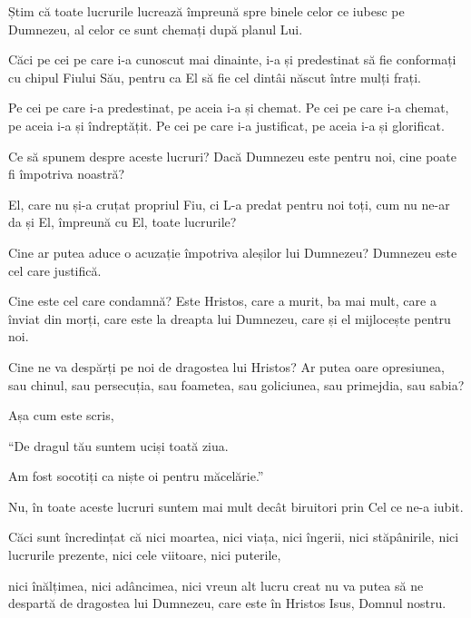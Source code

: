 {\par }{\PP {}Știm că toate lucrurile lucrează împreună spre binele celor ce iubesc pe Dumnezeu, al celor ce sunt chemați după planul Lui.

Căci pe cei pe care i-a cunoscut mai dinainte, i-a și predestinat să fie conformați cu chipul Fiului Său, pentru ca El să fie cel dintâi născut între mulți frați.

Pe cei pe care i-a predestinat, pe aceia i-a și chemat. Pe cei pe care i-a chemat, pe aceia i-a și îndreptățit. Pe cei pe care i-a justificat, pe aceia i-a și glorificat.


\par }{\PP {}Ce să spunem despre aceste lucruri? Dacă Dumnezeu este pentru noi, cine poate fi împotriva noastră?

El, care nu și-a cruțat propriul Fiu, ci L-a predat pentru noi toți, cum nu ne-ar da și El, împreună cu El, toate lucrurile?

Cine ar putea aduce o acuzație împotriva aleșilor lui Dumnezeu? Dumnezeu este cel care justifică.

Cine este cel care condamnă? Este Hristos, care a murit, ba mai mult, care a înviat din morți, care este la dreapta lui Dumnezeu, care și el mijlocește pentru noi.


\par }{\PP {}Cine ne va despărți pe noi de dragostea lui Hristos? Ar putea oare opresiunea, sau chinul, sau persecuția, sau foametea, sau goliciunea, sau primejdia, sau sabia?

Așa cum este scris,

\par }{\Q “De dragul tău suntem uciși toată ziua.

\par }{\QB Am fost socotiți ca niște oi pentru măcelărie.”


\par }{\MM {}Nu, în toate aceste lucruri suntem mai mult decât biruitori prin Cel ce ne-a iubit.

Căci sunt încredințat că nici moartea, nici viața, nici îngerii, nici stăpânirile, nici lucrurile prezente, nici cele viitoare, nici puterile,

nici înălțimea, nici adâncimea, nici vreun alt lucru creat nu va putea să ne despartă de dragostea lui Dumnezeu, care este în Hristos Isus, Domnul nostru.



}
